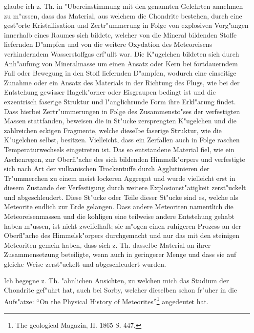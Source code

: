 \documentclass[a4paper, 11pt, oneside]{article}
\begin{document}
glaube ich z. Th. in "Ubereinstimmung mit den genannten Gelehrten annehmen zu m"ussen, dass das Material, aus welchem die Chondrite bestehen, durch eine gest"orte Kristallisation und Zertr"ummerung in Folge von explosiven Vorg"angen innerhalb eines Raumes sich bildete, welcher von die Mineral bildenden Stoffe liefernden D"ampfen und von die weitere Oxydation des Meteoreisens verhinderndem Wasserstoffgas erf"ullt war. Die K"ugelchen bildeten sich durch Anh"aufung von Mineralmasse um einen Ansatz oder Kern bei fortdauerndem Fall oder Bewegung in den Stoff liefernden D"ampfen, wodurch eine einseitige Zunahme oder ein Ansatz des Materials in der Richtung des Flugs, wie bei der Entstehung gewisser Hagelk"orner oder Eisgraupen bedingt ist und die exzentrisch faserige Struktur und l"anglichrunde Form ihre Erkl"arung findet. Dass hierbei Zertr"ummerungen in Folge des Zusammensto"ses der verfestigten Massen stattfanden, beweisen die in St"ucke zersprengten K"ugelchen und die zahlreichen eckigen Fragmente, welche dieselbe faserige Struktur, wie die K"ugelchen selbst, besitzen. Vielleicht, dass ein Zerfallen auch in Folge raschen Temperaturwechsels eingetreten ist. Das so entstandene Material fiel, wie ein Aschenregen, zur Oberfl"ache des sich bildenden Himmelk"orpers und verfestigte sich nach Art der vulkanischen Trockentuffe durch Agglutinieren der Tr"ummerchen zu einem meist lockeren Aggregat und wurde vielleicht erst in diesem Zustande der Verfestigung durch weitere Explosionst"atigkeit zerst"uckelt und abgeschleudert. Diese St"ucke oder Teile dieser St"ucke sind es, welche als Meteorite endlich zur Erde gelangen. Dass andere Meteoriten namentlich die Meteoreisenmassen und die kohligen eine teilweise andere Entstehung gehabt haben m"ussen, ist nicht zweifelhaft; sie m"ogen einen ruhigeren Prozess an der Oberfl"ache des Himmelsk"orpers durchgemacht und nur das mit den steinigen Meteoriten gemein haben, dass sich z. Th. dasselbe Material an ihrer Zusammensetzung beteiligte, wenn auch in geringerer Menge und dass sie auf gleiche Weise zerst"uckelt und abgeschleudert wurden.

Ich begegne z. Th. "ahnlichen Ansichten, zu welchen mich das Studium der Chondrite gef"uhrt hat, auch bei Sorby, welcher dieselben schon fr"uher in die Aufs"atze: "`On the Physical History of Meteorites"'\footnote{The geological Magazin, II. 1865 S. 447.} angedeutet hat.
\end{document}
